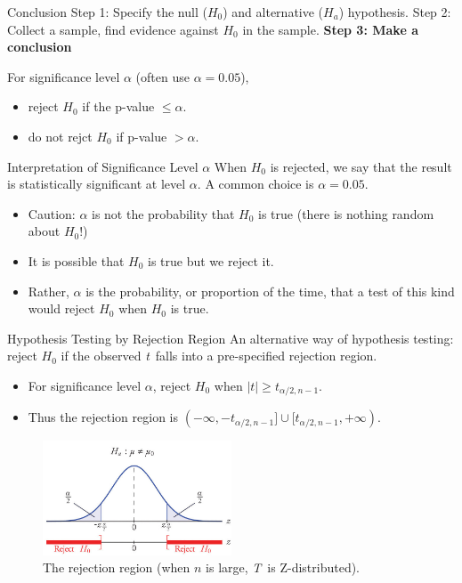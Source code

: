 \documentclass{beamer}
\newcommand{\TS}{\textit{T}}
\newcommand{\ts}{\textit{t}}
\begin{document}
\begin{frame}{Conclusion}
Step 1: Specify the null ($H_0$) and alternative ($H_a$) hypothesis.
Step 2: Collect a sample, find evidence against $H_0$ in the sample.
\textbf{Step 3: Make a conclusion}

For significance level $\alpha$ (often use $\alpha=0.05$), 
\begin{itemize}
\item reject $H_0$ if the p-value $\leq\alpha$.
\item do not rejct $H_0$ if p-value $> \alpha$.
\end{itemize}
\end{frame}

\begin{frame}{Interpretation of Significance Level $\alpha$}
When $H_0$ is rejected, we say that the result is statistically significant at level $\alpha$. A common choice is $\alpha=0.05$.
\begin{itemize}
\item Caution: $\alpha$ is not the probability that $H_0$ is true (there is nothing random about $H_0$!)
\item It is possible that $H_0$ is true but we reject it.
\item Rather, $\alpha$ is the probability, or proportion of the time, that a test of this kind would reject $H_0$ when $H_0$ is true.
\end{itemize}
\end{frame}

\begin{frame}{Hypothesis Testing by Rejection Region}
An alternative way of hypothesis testing:
reject $H_0$ if the observed \ts\ falls into a pre-specified \alert{rejection region}.

\begin{itemize}
\item For significance level $\alpha$,
reject $H_0$ when $|\ts| \geq t_{\alpha/2,n-1}$.
\item Thus the rejection region is $(-\infty, -t_{\alpha/2,n-1}] \cup [t_{\alpha/2,n-1},+\infty)$.
\end{itemize}
\vspace{-0.4cm}
\begin{figure}\caption{The rejection region (when $n$ is large, \TS\ is Z-distributed).}
\includegraphics[width=0.5\textwidth]{figures/hypo_test_z.jpg}
\end{figure}
\end{frame}
\end{document}
